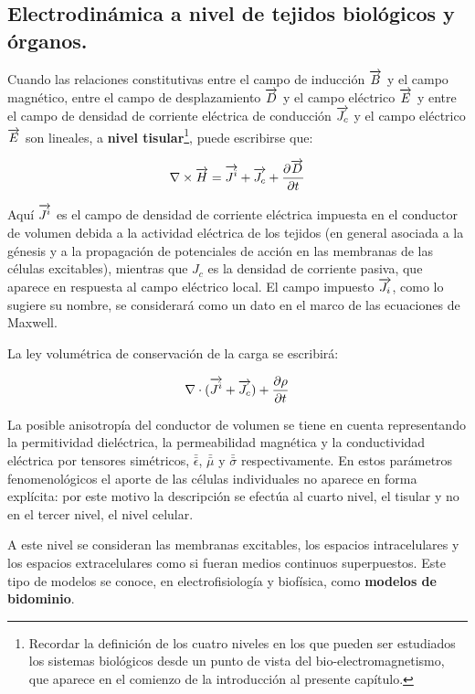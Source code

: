 \subsection{Electrodinámica a nivel de tejidos biológicos y órganos.}

Cuando las relaciones constitutivas entre el campo de inducción $\overrightarrow{B}$ y el campo magnético, entre el campo de desplazamiento $\overrightarrow{D}$ y el campo eléctrico $\overrightarrow{E}$ y entre el campo de densidad de corriente eléctrica de conducción $\overrightarrow{J_{c}}$ y el campo eléctrico $\overrightarrow{E}$ son lineales, a \textbf{nivel tisular}\footnote{Recordar la definición de los cuatro niveles en los que pueden ser estudiados los sistemas biológicos desde un punto de vista del bio-electromagnetismo, que aparece en el comienzo de la introducción al presente capítulo.}, puede escribirse que:

\begin{equation}
	\nabla \times \overrightarrow{H}= \overrightarrow{J^{i}}+\overrightarrow{J_{c}}+\dfrac{\partial \overrightarrow{D}}{\partial t}
\end{equation}

Aquí $\overrightarrow{J^{i}}$ es el campo de densidad de corriente eléctrica impuesta en el conductor de volumen debida a la actividad eléctrica de los tejidos (en general asociada a la génesis y a la propagación de potenciales de acción en las membranas de las células excitables), mientras que $J_{c}$ es la densidad de corriente pasiva, que aparece en respuesta al campo eléctrico local. El campo impuesto $\overrightarrow{J_{i}}$, como lo sugiere su nombre, se considerará como un dato en el marco de las ecuaciones de Maxwell. 

La ley volumétrica de conservación de la carga se escribirá:

\begin{equation}
	\nabla \cdot (\overrightarrow{J^{i}} + \overrightarrow{J_{c}} ) +  \dfrac{\partial \rho}{\partial t} 
\end{equation}

La posible anisotropía del conductor de volumen se tiene en cuenta representando la permitividad dieléctrica, la permeabilidad magnética y la conductividad eléctrica por tensores simétricos, $\bar{\bar{\epsilon}}$, $\bar{\bar{\mu}}$ y $\bar{\bar{\sigma}}$ respectivamente.
En estos parámetros fenomenológicos el aporte de las células individuales no aparece en forma explícita: por este motivo la descripción se efectúa al cuarto nivel, el tisular y no en el tercer nivel, el nivel celular.

A este nivel se consideran las membranas excitables, los espacios intracelulares y los espacios extracelulares como si fueran medios continuos superpuestos. Este tipo de modelos se conoce, en electrofisiología y biofísica, como \textbf{modelos de bidominio}.

